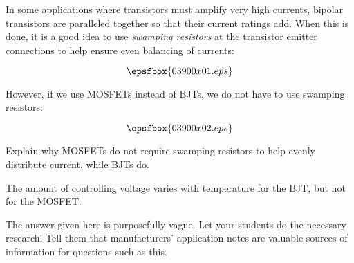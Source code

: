 

In some applications where transistors must amplify very high currents, bipolar transistors are paralleled together so that their current ratings add.  When this is done, it is a good idea to use {\it swamping resistors} at the transistor emitter connections to help ensure even balancing of currents:

$$\epsfbox{03900x01.eps}$$

However, if we use MOSFETs instead of BJTs, we do not have to use swamping resistors:

$$\epsfbox{03900x02.eps}$$

Explain why MOSFETs do not require swamping resistors to help evenly distribute current, while BJTs do.







The amount of controlling voltage varies with temperature for the BJT, but not for the MOSFET.







The answer given here is purposefully vague.  Let your students do the necessary research!  Tell them that manufacturers' application notes are valuable sources of information for questions such as this.




